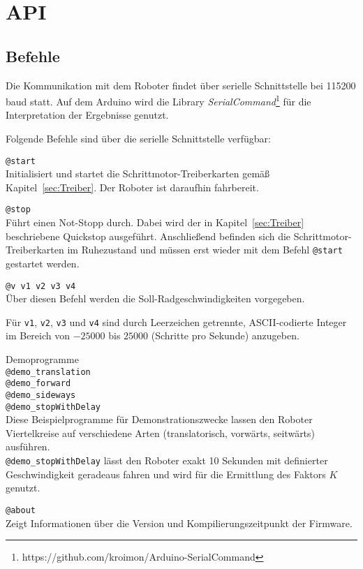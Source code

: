 
\section{API}
\label{sec:API}
\subsection{Befehle}
Die Kommunikation mit dem Roboter findet über serielle Schnittstelle bei 115200 baud statt.
Auf dem Arduino wird die Library \emph{SerialCommand}\footnote{https://github.com/kroimon/Arduino-SerialCommand} für die Interpretation der Ergebnisse genutzt.

Folgende Befehle sind über die serielle Schnittstelle verfügbar:
\begin{description}
\item \lstinline{@start} \\
Initialisiert und startet die Schrittmotor-Treiberkarten gemäß Kapitel~\ref{sec:Treiber}.
Der Roboter ist daraufhin fahrbereit.

\item \lstinline{@stop} \\
Führt einen Not-Stopp durch. Dabei wird der in Kapitel~\ref{sec:Treiber} beschriebene Quickstop ausgeführt.
Anschließend befinden sich die Schrittmotor-Treiberkarten im Ruhezustand und müssen erst wieder mit dem Befehl \lstinline{@start} gestartet werden.

\item \lstinline{@v v1 v2 v3 v4}\\
Über diesen Befehl werden die Soll-Radgeschwindigkeiten vorgegeben.

Für \lstinline{v1}, \lstinline{v2}, \lstinline{v3} und \lstinline{v4} sind durch Leerzeichen getrennte, ASCII-codierte Integer im Bereich von $-25000$ bis $25000$ (Schritte pro Sekunde) anzugeben.

\item Demoprogramme\\
    \lstinline{@demo_translation}\\
    \lstinline{@demo_forward}\\
    \lstinline{@demo_sideways}\\
    \lstinline{@demo_stopWithDelay}\\
Diese Beispielprogramme für Demonstrationszwecke lassen den Roboter Viertelkreise auf verschiedene Arten (translatorisch, vorwärts, seitwärts) ausführen.\\
\lstinline{@demo_stopWithDelay} lässt den Roboter exakt 10 Sekunden mit definierter Geschwindigkeit geradeaus fahren und wird für die Ermittlung des Faktors $K$ genutzt.

\item \lstinline{@about} \\
Zeigt Informationen über die Version und Kompilierungszeitpunkt der Firmware.
\end{description}



